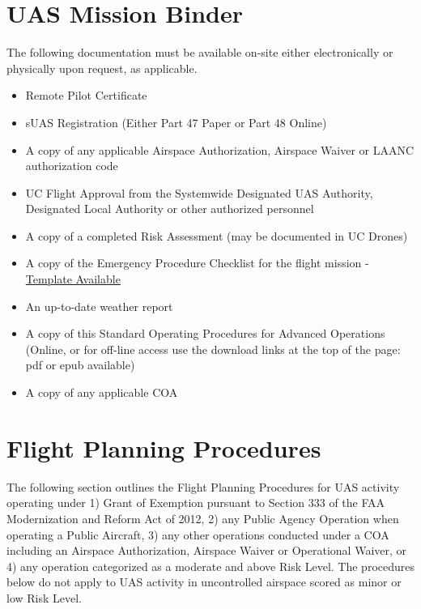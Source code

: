 \documentclass[
]{book}
\providecommand{\tightlist}{%
  \setlength{\itemsep}{0pt}\setlength{\parskip}{0pt}}
\begin{document}
\hypertarget{ch-mission-binder}{%
\chapter{UAS Mission Binder}\label{ch-mission-binder}}

The following documentation must be available on-site either electronically or physically upon request, as applicable.

\begin{itemize}
\tightlist
\item
  Remote Pilot Certificate
\item
  sUAS Registration (Either Part 47 Paper or Part 48 Online)
\item
  A copy of any applicable Airspace Authorization, Airspace Waiver or LAANC authorization code
\item
  UC Flight Approval from the Systemwide Designated UAS Authority, Designated Local Authority or other authorized personnel
\item
  A copy of a completed Risk Assessment (may be documented in UC Drones)
\item
  A copy of the Emergency Procedure Checklist for the flight mission - \href{https://ucdrones.github.io/ch-resources.html}{Template Available}
\item
  An up-to-date weather report
\item
  A copy of this Standard Operating Procedures for Advanced Operations (Online, or for off-line access use the download links at the top of the page: pdf or epub available)
\item
  A copy of any applicable COA
\end{itemize}

\hypertarget{ch-flight-planning}{%
\chapter{Flight Planning Procedures}\label{ch-flight-planning}}

The following section outlines the Flight Planning Procedures for UAS activity operating under 1) Grant of Exemption pursuant to Section 333 of the FAA Modernization and Reform Act of 2012, 2) any Public Agency Operation when operating a Public Aircraft, 3) any other operations conducted under a COA including an Airspace Authorization, Airspace Waiver or Operational Waiver, or 4) any operation categorized as a moderate and above Risk Level. The procedures below do not apply to UAS activity in uncontrolled airspace scored as minor or low Risk Level.
\end{document}
